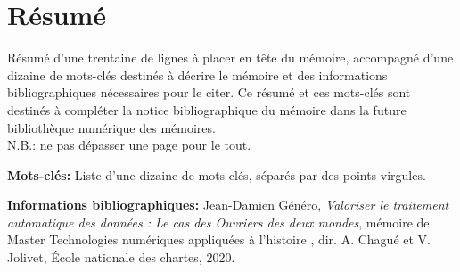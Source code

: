 \section*{Résumé}

 Résumé d'une trentaine de lignes à placer en tête du mémoire, accompagné d'une dizaine de mots-clés destinés à décrire le mémoire et des informations bibliographiques nécessaires pour le citer. Ce résumé et ces mots-clés sont destinés à compléter la notice bibliographique du mémoire dans la future bibliothèque numérique des mémoires.\\
N.B.: ne pas dépasser une page pour le tout.

\medskip

\textbf{Mots-clés:} Liste d'une dizaine de mots-clés, séparés par des points-virgules.

\textbf{Informations bibliographiques:} Jean-Damien Généro, \textit{Valoriser le traitement automatique des données : Le cas des Ouvriers des deux mondes}, mémoire de Master \og Technologies numériques appliquées à l'histoire \fg{}, dir. A. Chagué et V. Jolivet, École nationale des chartes, 2020.
